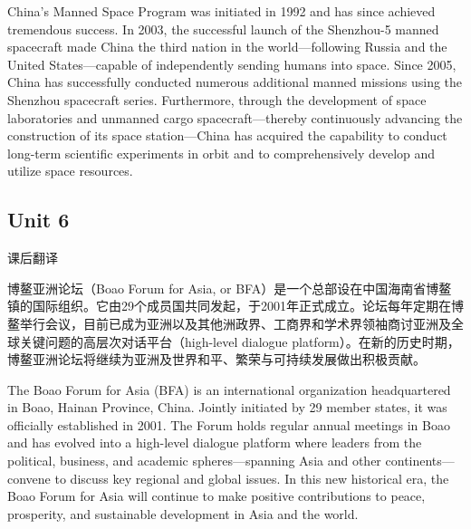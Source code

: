 \begin{solution}
	
China's Manned Space Program was initiated in 1992 and has since achieved tremendous success. In 2003, the successful launch of the Shenzhou-5 manned spacecraft made China the third nation in the world—following Russia and the United States—capable of independently sending humans into space. Since 2005, China has successfully conducted numerous additional manned missions using the Shenzhou spacecraft series. Furthermore, through the development of space laboratories and unmanned cargo spacecraft—thereby continuously advancing the construction of its space station—China has acquired the capability to conduct long-term scientific experiments in orbit and to comprehensively develop and utilize space resources.
	
\end{solution}

\subsection{Unit 6}

\begin{question}{课后翻译}

博鳌亚洲论坛（Boao Forum for Asia, or BFA）是一个总部设在中国海南省博鳌镇的国际组织。它由29个成员国共同发起，于2001年正式成立。论坛每年定期在博鳌举行会议，目前已成为亚洲以及其他洲政界、工商界和学术界领袖商讨亚洲及全球关键问题的高层次对话平台（high-level dialogue platform）。在新的历史时期，博鳌亚洲论坛将继续为亚洲及世界和平、繁荣与可持续发展做出积极贡献。

\end{question}

\begin{solution}
	
The Boao Forum for Asia (BFA) is an international organization headquartered in Boao, Hainan Province, China. Jointly initiated by 29 member states, it was officially established in 2001. The Forum holds regular annual meetings in Boao and has evolved into a high-level dialogue platform where leaders from the political, business, and academic spheres—spanning Asia and other continents—convene to discuss key regional and global issues. In this new historical era, the Boao Forum for Asia will continue to make positive contributions to peace, prosperity, and sustainable development in Asia and the world.
	
\end{solution}

\newpage